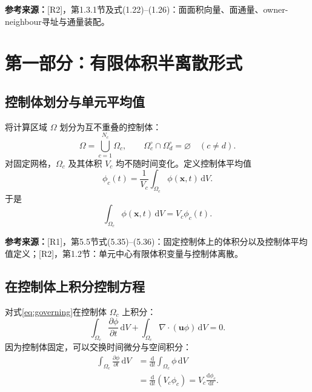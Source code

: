 \documentclass[UTF8,12pt,a4paper]{ctexart}
\numberwithin{equation}{section}
\newcommand{\Rone}{\textnormal{[R1]}}
\newcommand{\Rtwo}{\textnormal{[R2]}}
\newcommand{\source}[1]{%
  \par\smallskip
  \noindent\colorbox{sourcebg}{%
    \parbox{0.955\linewidth}{\footnotesize\color{sourcegray}\textbf{参考来源：}#1}%
  }
  \par\smallskip
}
\newcommand{\dd}{\,\mathrm d}
\begin{document}
\source{\Rtwo，第1.3.1节及式(1.22)--(1.26)：面面积向量、面通量、owner-neighbour寻址与通量装配。}

\newpage
\section{第一部分：有限体积半离散形式}

\subsection{控制体划分与单元平均值}

将计算区域 $\Omega$ 划分为互不重叠的控制体：
\begin{equation}
  \Omega=\bigcup_{c=1}^{N_c}\Omega_c,
  \qquad
  \Omega_c^{\circ}\cap\Omega_d^{\circ}=\varnothing
  \quad(c\neq d).
  \label{eq:mesh_partition}
\end{equation}
对固定网格，$\Omega_c$ 及其体积 $V_c$ 均不随时间变化。定义控制体平均值
\begin{equation}
  \phi_c(t)
  =\frac{1}{V_c}\int_{\Omega_c}\phi(\bm x,t)\dd V.
  \label{eq:cell_average}
\end{equation}
于是
\begin{equation}
  \int_{\Omega_c}\phi(\bm x,t)\dd V=V_c\phi_c(t).
  \label{eq:cell_integral}
\end{equation}

\source{\Rone，第5.5节式(5.35)--(5.36)：固定控制体上的体积分以及控制体平均值定义；\Rtwo，第1.2节：单元中心有限体积变量与控制体离散。}

\subsection{在控制体上积分控制方程}

对式\eqref{eq:governing}在控制体 $\Omega_c$ 上积分：
\begin{equation}
  \int_{\Omega_c}\frac{\partial\phi}{\partial t}\dd V
  +\int_{\Omega_c}\nabla\cdot(\bm u\phi)\dd V=0.
  \label{eq:cell_integrated_pde}
\end{equation}
因为控制体固定，可以交换时间微分与空间积分：
\begin{align}
  \int_{\Omega_c}\frac{\partial\phi}{\partial t}\dd V
  &=\frac{\mathrm d}{\mathrm dt}\int_{\Omega_c}\phi\dd V
  \label{eq:time_exchange}\\
  &=\frac{\mathrm d}{\mathrm dt}(V_c\phi_c)
  =V_c\frac{\mathrm d\phi_c}{\mathrm dt}.
  \label{eq:time_cell_average}
\end{align}
\end{document}
